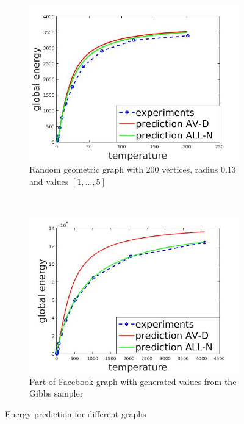 \documentclass[12pt]{report}
\begin{document}
\begin{figure}[t]
\begin{subfigure}[b]{0.4\textwidth}
    \end{subfigure}   
    
    \begin{subfigure}[b]{0.4\textwidth}
        \includegraphics[width=\textwidth]{rgg200x013}
        \caption{ Random geometric graph with 200 vertices, radius 0.13 and values $[1, ..., 5]$ }

    \end{subfigure}
    ~
    \begin{subfigure}[b]{0.4\textwidth}
        \includegraphics[width=\textwidth]{facebookEnergy}
        \caption{ Part of Facebook graph \cite{Facebook} with generated values from the Gibbs sampler }

    \end{subfigure}
    
    \caption{Energy prediction for different graphs}
    \label{fig:energyPrediction5}
\end{figure}
\end{document}
